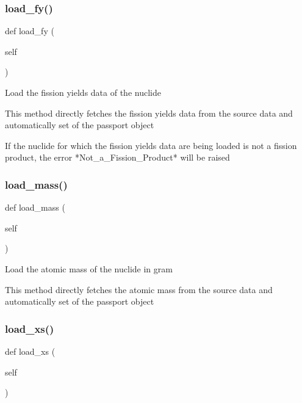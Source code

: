 \subsubsection{\texorpdfstring{load\+\_\+fy()}{load\_fy()}}
{\footnotesize\ttfamily def load\+\_\+fy (\begin{DoxyParamCaption}\item[{}]{self }\end{DoxyParamCaption})}

\begin{DoxyVerb}Load the fission yields data of the nuclide

This method directly fetches the fission yields data from the source data and automatically set
of the passport object

If the nuclide for which the fission yields data are being loaded is not a fission product,
the error *Not_a_Fission_Product* will be raised\end{DoxyVerb}
 \mbox{\label{classopenbu_1_1passport_1_1_passport_a791d705e172d19c0cdc181960287cc78}} 
\subsubsection{\texorpdfstring{load\+\_\+mass()}{load\_mass()}}
{\footnotesize\ttfamily def load\+\_\+mass (\begin{DoxyParamCaption}\item[{}]{self }\end{DoxyParamCaption})}

\begin{DoxyVerb}Load the atomic mass of the nuclide in gram

This method directly fetches the atomic mass from the source data and automatically set
of the passport object\end{DoxyVerb}
 \mbox{\label{classopenbu_1_1passport_1_1_passport_a1687aea883b9cdececdb7b88b659cd5c}} 
\subsubsection{\texorpdfstring{load\+\_\+xs()}{load\_xs()}}
{\footnotesize\ttfamily def load\+\_\+xs (\begin{DoxyParamCaption}\item[{}]{self }\end{DoxyParamCaption})}


